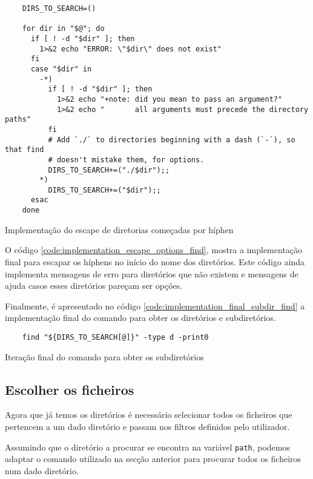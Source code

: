 \begin{listing}[H]
	\centering
	\begin{verbatim}
    DIRS_TO_SEARCH=()

    for dir in "$@"; do
      if [ ! -d "$dir" ]; then
        1>&2 echo "ERROR: \"$dir\" does not exist"
      fi
      case "$dir" in
        -*)
          if [ ! -d "$dir" ]; then
            1>&2 echo "+note: did you mean to pass an argument?"
            1>&2 echo "       all arguments must precede the directory paths"
          fi
          # Add `./` to directories beginning with a dash (`-`), so that find
          # doesn't mistake them, for options.
          DIRS_TO_SEARCH+=("./$dir");;
        *)
          DIRS_TO_SEARCH+=("$dir");;
      esac
    done
  \end{verbatim}
	\caption{Implementação do escape de diretorias começadas por híphen}
	\label{code:implementation_escape_options_find}
\end{listing}

O código \ref{code:implementation_escape_options_find}, mostra a implementação
final para escapar os híphens no início do nome dos diretórios. Este código
ainda implementa mensagens de erro para diretórios que não existem e mensagens
de ajuda casos esses diretórios pareçam ser opções.

Finalmente, é apresentado no código \ref{code:implementation_final_subdir_find}
a implementação final do comando para obter os diretórios e subdiretórios.

\begin{listing}[H]
	\centering
	\begin{verbatim}
    find "${DIRS_TO_SEARCH[@]}" -type d -print0
  \end{verbatim}
	\caption{Iteração final do comando para obter os subdiretórios}
	\label{code:implementation_final_subdir_find}
\end{listing}

\subsection{Escolher os ficheiros}\label{sec:implementation_choosing_files}

Agora que já temos os diretórios é necessário selecionar todos os ficheiros que
pertencem a um dado diretório e passam nos filtros definidos pelo utilizador.

Assumindo que o diretório a procurar se encontra na variável \Verb|path|, podemos
adaptar o comando utilizado na secção anterior para procurar todos os ficheiros
num dado diretório.

